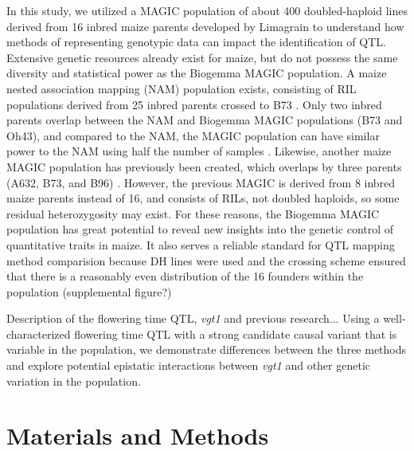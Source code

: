 \documentclass[article,9pt,twocolumn,twoside]{rilabRxiv}
\begin{document}
In this study, we utilized a MAGIC population of about 400 doubled-haploid lines derived from 16 inbred maize parents developed by Limagrain to understand how methods of representing genotypic data can impact the identification of QTL. Extensive genetic resources already exist for maize, but do not possess the same diversity and statistical power as the Biogemma MAGIC population. A maize nested association mapping (NAM) population exists, consisting of RIL populations derived from 25 inbred parents crossed to B73 \citep{RN11}.  Only two inbred parents overlap between the NAM and Biogemma MAGIC populations (B73 and Oh43), and compared to the NAM, the MAGIC population can have similar power to the NAM using half the number of samples \citep{RN4}. Likewise, another maize MAGIC population has previously been created, which overlaps by three parents (A632, B73, and B96) \citep{RN4}. However, the previous MAGIC is derived from 8 inbred maize parents instead of 16, and consists of RILs, not doubled haploids, so some residual heterozygosity may exist.  For these reasons, the Biogemma MAGIC population has great potential to reveal new insights into the genetic control of quantitative traits in maize. It also serves a reliable standard for QTL mapping method comparision because DH lines were used and the crossing scheme ensured that there is a reasonably even distribution of the 16 founders within the population (supplemental figure?)

Description of the flowering time QTL, \emph{vgt1} and previous research...
Using a well-characterized flowering time QTL with a strong candidate causal variant that is variable in the population, we demonstrate differences between the three methods and explore potential epistatic interactions between \emph{vgt1} and other genetic variation in the population.
\section{Materials and Methods}
\label{sec:materials:methods}
\end{document}

